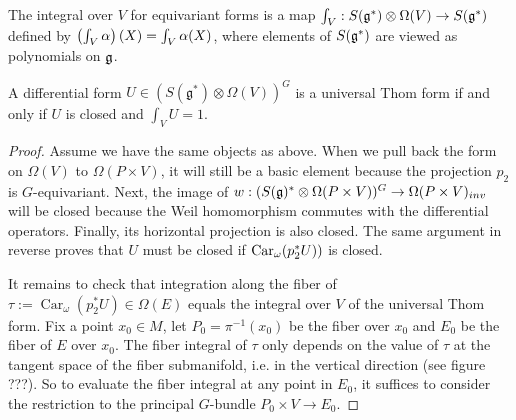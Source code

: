 The integral over $V$ for equivariant forms
is a map  $\int_V : S(\operatorname{\mathfrak{g}}^*)\otimes \Omega(V) \to S(\operatorname{\mathfrak{g}}^*)$ defined by 
$\paren{\int_V \alpha}(X) = \int_V \alpha(X)$, where elements of $S(\operatorname{\mathfrak{g}}^*)$ are 
viewed as  polynomials on $\operatorname{\mathfrak{g}}$. 

\begin{thm} 
	A differential form $U\in (S(\mathfrak{g}^*)\otimes \Omega(V))^G$ is a 
	universal Thom form if and only if $U$ is closed and  $\int_V U = 1$.
\end{thm}
\begin{proof}
	Assume we have the same objects as above.
	When we pull back the form on $\Omega(V)$ to $\Omega(P\times V)$, it
	will still be a basic element because the projection $p_2$ is 
	$G$-equivariant. Next, the image of    
	$w:(S(\operatorname{\mathfrak{g}})^*\otimes \Omega(P\times V))^G \to \Omega(P\times V)_{inv}$ 
	will be closed because the Weil homomorphism
	commutes with the differential operators. Finally, its horizontal
	projection is also closed. The same argument
	in reverse proves that $U$ must be closed if  $\operatorname{Car}_\omega(p_2^*U))$ is
	closed.

	It remains to check that integration along the fiber of
	$\tau:=\operatorname{Car}_{\omega}(p_2^*U)\in\Omega(E)$ equals the integral
	over  $V$ of the universal Thom form.
	Fix a point $x_0\in M$, let $P_0=\pi^{-1}(x_0)$ be the fiber over $x_0$
	and $E_0$ be the fiber of $E$ over  $x_0$. 
	The fiber integral of $\tau$ only depends on the value of $\tau$ at the
	tangent space of the fiber submanifold, i.e. in the vertical direction (see
	figure ???). 
	So to evaluate the fiber integral at any point in $E_0$, it suffices to 
	consider the restriction to the principal $G$-bundle 
	$P_0\times V \to E_0$.


\end{proof}
